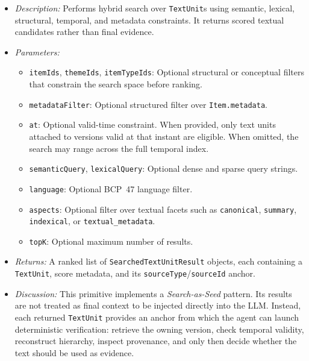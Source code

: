 \documentclass[11pt]{article}
\begin{document}
\begin{itemize}
    \item \textit{Description:} Performs hybrid search over \texttt{TextUnit}s using semantic, lexical, structural, temporal, and metadata constraints. It returns scored textual candidates rather than final evidence.
    \item \textit{Parameters:}
    \begin{itemize}
        \item \texttt{itemIds}, \texttt{themeIds}, \texttt{itemTypeIds}: Optional structural or conceptual filters that constrain the search space before ranking.
        \item \texttt{metadataFilter}: Optional structured filter over \texttt{Item.metadata}.
        \item \texttt{at}: Optional valid-time constraint. When provided, only text units attached to versions valid at that instant are eligible. When omitted, the search may range across the full temporal index.
        \item \texttt{semanticQuery}, \texttt{lexicalQuery}: Optional dense and sparse query strings.
        \item \texttt{language}: Optional BCP~47 language filter.
        \item \texttt{aspects}: Optional filter over textual facets such as \texttt{canonical}, \texttt{summary}, \texttt{indexical}, or \texttt{textual\_metadata}.
        \item \texttt{topK}: Optional maximum number of results.
    \end{itemize}
    \item \textit{Returns:} A ranked list of \texttt{SearchedTextUnitResult} objects, each containing a \texttt{TextUnit}, score metadata, and its \texttt{sourceType}/\texttt{sourceId} anchor.
    \item \textit{Discussion:} This primitive implements a \textit{Search-as-Seed} pattern. Its results are not treated as final context to be injected directly into the LLM. Instead, each returned \texttt{TextUnit} provides an anchor from which the agent can launch deterministic verification: retrieve the owning version, check temporal validity, reconstruct hierarchy, inspect provenance, and only then decide whether the text should be used as evidence.
\end{itemize}
\end{document}
